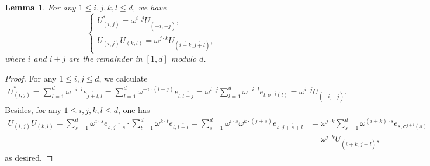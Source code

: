 \documentclass[oneside,english,a4wide]{amsart}
\numberwithin{equation}{section}
\numberwithin{figure}{section}
\theoremstyle{plain}
\theoremstyle{plain}
\theoremstyle{definition}
\theoremstyle{plain}
\newtheorem{lemma}[thm]{Lemma}
\theoremstyle{remark}
\theoremstyle{definition}
\theoremstyle{remark}
\theoremstyle{definition}
\newcommand{\8}{\infty}
\begin{document}
\begin{lemma}\label{uuu} 
For any $ 1\le i,j, k, l\le d$, we have
\begin{equation}
	\begin{cases}
		U_{(i, j)}^*=\omega^{i\cdot j}U_{(\overline{-i}, \overline{-j})},\\
		U_{(i, j)}U_{(k, l)}=\omega^{j\cdot k}U_{(\overline{i+k}, \overline{j+l})},
	\end{cases}
\end{equation}
where $\overline{i}$ and $\overline{i+j}$ are the remainder in $[1, d]$ modulo $d$.
\end{lemma}
\begin{proof}
	For any $1\le i,j\le d$, we calculate
	\begin{equation*}
		\begin{aligned}
			U_{(i, j)}^*=\sum_{l=1}^d \omega^{-i\cdot l}e_{\overline{j+l},l}=\sum_{l=1}^d \omega^{-i\cdot (l-j)}e_{l,\overline{l-j}}=\omega^{i\cdot j}\sum_{l=1}^d \omega^{-i\cdot l}e_{l,\sigma^{-j}(l)}=\omega^{i\cdot j}U_{(\overline{-i}, \overline{-j})}.
		\end{aligned}
	\end{equation*}
Besides, for any $ 1\le i,j, k, l\le d$, one has
\begin{equation*}
	\begin{aligned}
		U_{(i, j)}U_{(k, l)}=\sum_{s=1}^d \omega^{i\cdot s}e_{s,\overline{j+s}}\cdot \sum_{t=1}^d \omega^{k\cdot t}e_{t,\overline{t+l}}=\sum_{s=1}^d \omega^{i\cdot s}\omega^{k\cdot (j+s)}e_{s,\overline{j+s+l}}{}&=\omega^{j\cdot k}\sum_{s=1}^d \omega^{(i+k)\cdot s}e_{s,\sigma^{j+l}(s)}\\
		&=\omega^{j\cdot k}U_{(\overline{i+k}, \overline{j+l})},
	\end{aligned}
\end{equation*}
as desired.
\end{proof}
\end{document}
